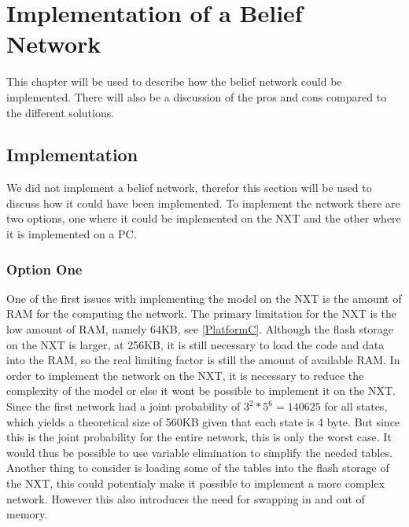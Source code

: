 \chapter{Implementation of a Belief Network}
This chapter will be used to describe how the belief network could be
implemented. There will also be a discussion of the pros and cons compared to
the different solutions.

\section{Implementation}
We did not implement a belief network, therefor this section will be used to
discuss how it could have been implemented. To implement the network there are
two options, one where it could be implemented on the NXT and the other where it is
implemented on a PC.

%

\subsection{Option One}
One of the first issues with implementing the model on the NXT is the amount of
RAM for the computing the network. The primary limitation for the NXT is the
low amount of RAM, namely 64KB, see \autoref{PlatformC}. Although the flash
storage on the NXT is larger, at 256KB, it is still necessary to load the code
and data into the RAM, so the real limiting factor is still the amount of
available RAM. In order to implement the network on the NXT, it is necessary to
reduce the complexity of the model or else it wont be possible to implement it on the NXT.
Since the first network had a joint probability of $3^2*5^6 = 140625$ for
all states, which yields a theoretical size of 560KB given that each state is 4
byte. But since this is the joint probability for the entire network, this is only the
worst case. It would thus be possible to use variable elimination to simplify
the needed tables. Another thing to consider is loading some of the tables into
the flash storage of the NXT, this could potentialy make it possible to
implement a more complex network. However this also introduces the need for
swapping in and out of memory. 

